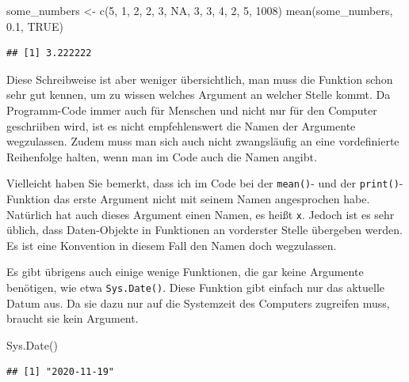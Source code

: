 \documentclass[
]{book}
\newenvironment{Shaded}{\begin{snugshade}}{\end{snugshade}}
\newcommand{\ConstantTok}[1]{\textcolor[rgb]{0.00,0.00,0.00}{#1}}
\newcommand{\DecValTok}[1]{\textcolor[rgb]{0.00,0.00,0.81}{#1}}
\newcommand{\FloatTok}[1]{\textcolor[rgb]{0.00,0.00,0.81}{#1}}
\newcommand{\FunctionTok}[1]{\textcolor[rgb]{0.00,0.00,0.00}{#1}}
\newcommand{\NormalTok}[1]{#1}
\newcommand{\OtherTok}[1]{\textcolor[rgb]{0.56,0.35,0.01}{#1}}
\begin{document}
\begin{Shaded}
\begin{Highlighting}[]
\NormalTok{some\_numbers }\OtherTok{\textless{}{-}} \FunctionTok{c}\NormalTok{(}\DecValTok{5}\NormalTok{, }\DecValTok{1}\NormalTok{, }\DecValTok{2}\NormalTok{, }\DecValTok{2}\NormalTok{, }\DecValTok{3}\NormalTok{, }\ConstantTok{NA}\NormalTok{, }\DecValTok{3}\NormalTok{, }\DecValTok{3}\NormalTok{, }\DecValTok{4}\NormalTok{, }\DecValTok{2}\NormalTok{, }\DecValTok{5}\NormalTok{, }\DecValTok{1008}\NormalTok{)}
\FunctionTok{mean}\NormalTok{(some\_numbers, }\FloatTok{0.1}\NormalTok{, }\ConstantTok{TRUE}\NormalTok{)}
\end{Highlighting}
\end{Shaded}

\begin{verbatim}
## [1] 3.222222
\end{verbatim}

Diese Schreibweise ist aber weniger übersichtlich, man muss die Funktion schon sehr gut kennen, um zu wissen welches Argument an welcher Stelle kommt. Da Programm-Code immer auch für Menschen und nicht nur für den Computer geschriiben wird, ist es nicht empfehlenswert die Namen der Argumente wegzulassen. Zudem muss man sich auch nicht zwangsläufig an eine vordefinierte Reihenfolge halten, wenn man im Code auch die Namen angibt.

Vielleicht haben Sie bemerkt, dass ich im Code bei der \texttt{mean()}- und der \texttt{print()}-Funktion das erste Argument nicht mit seinem Namen angesprochen habe. Natürlich hat auch dieses Argument einen Namen, es heißt \texttt{x}. Jedoch ist es sehr üblich, dass Daten-Objekte in Funktionen an vorderster Stelle übergeben werden. Es ist eine Konvention in diesem Fall den Namen doch wegzulassen.

Es gibt übrigens auch einige wenige Funktionen, die gar keine Argumente benötigen, wie etwa \texttt{Sys.Date()}. Diese Funktion gibt einfach nur das aktuelle Datum aus. Da sie dazu nur auf die Systemzeit des Computers zugreifen muss, braucht sie kein Argument.

\begin{Shaded}
\begin{Highlighting}[]
\FunctionTok{Sys.Date}\NormalTok{()}
\end{Highlighting}
\end{Shaded}

\begin{verbatim}
## [1] "2020-11-19"
\end{verbatim}
\end{document}
